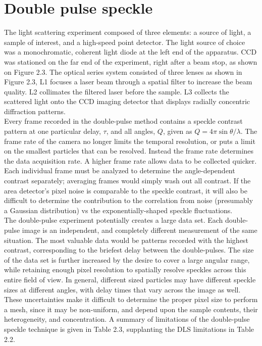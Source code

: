 \vspace{10mm}

\section{Double pulse speckle}

The light scattering experiment composed of three elements: a source of light, a sample of interest, and a high-speed point detector. The light source of choice was a monochromatic, coherent light diode at the left end of the apparatus. CCD was stationed on the far end of the experiment, right after a beam stop, as shown on Figure 2.3. The optical series system consisted of three lenses as shown in Figure 2.3, L1 focuses a laser beam through a spatial filter to increase the beam quality. L2 collimates the filtered laser before the sample. L3 collects the scattered light onto the CCD imaging detector that displays radially concentric diffraction patterns.\\


Every frame recorded in the double-pulse method contains a speckle contrast pattern at one particular delay, $\tau$, and all angles, $Q$, given as $Q = 4\pi\sin\theta/\lambda$.  The frame rate of the camera no longer limits the temporal resolution, or puts a limit on the smallest particles that can be resolved.  Instead the frame rate determines the data acquisition rate.  A higher frame rate allows data to be collected quicker.  Each individual frame must be analyzed to determine the angle-dependent contrast separately; averaging frames would simply wash out all contrast.  If the area detector’s pixel noise is comparable to the speckle contrast, it will also be difficult to determine the contribution to the correlation from noise (presumably a Gaussian distribution) vs the exponentially-shaped speckle fluctuations. \\

The double-pulse experiment potentially creates a large data set.  Each double-pulse image is an independent, and completely different measurement of the same situation.  The most valuable data would be patterns recorded with the highest contrast, corresponding to the briefest delay between the double-pulses.  The size of the data set is further increased by the desire to cover a large angular range, while retaining enough pixel resolution to spatially resolve speckles across this entire field of view.  In general, different sized particles may have different speckle sizes at different angles, with delay times that vary across the image as well. These uncertainties make it difficult to determine the proper pixel size to perform a mesh, since it may be non-uniform, and depend upon the sample contents, their heterogeneity, and concentration.  A summary of limitations of the double-pulse speckle technique is given in Table 2.3, supplanting the DLS limitations in Table 2.2.  \\



